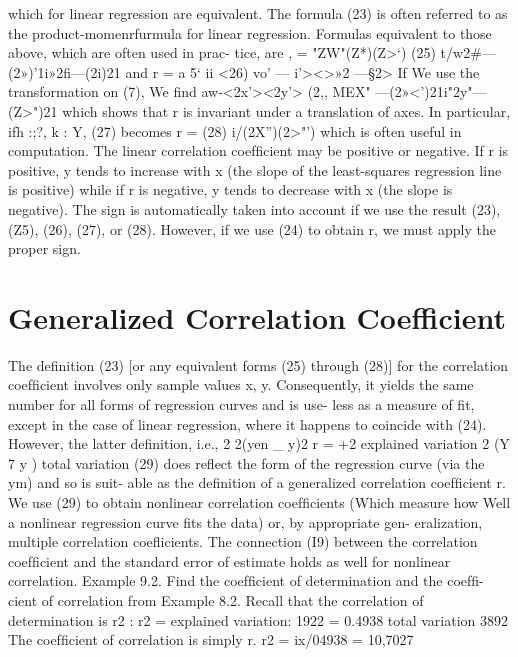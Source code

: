{%
which for linear regression are equivalent. The formula (23) is often
referred to as the product-momenrfurmula for linear regression.
Formulas equivalent to those above, which are often used in prac-
tice, are
, = "ZW"(Z*)(Z>‘) (25)
t/w2#—(2»)’1i»2ﬁ—(2i)21
and
r = a 5‘ ii <26)
vo’ — i’><>»2 —§2>
If We use the transformation on (7), We ﬁnd
 aw-<2x'><2y'> (2,,
\/MEX" —(2»<')21i"2y"—(Z>")21
which shows that r is invariant under a translation of axes. In particular,
ifh :;?, k : Y, (27) becomes
r =  (28)
i/(2X”)(2>"’)
which is often useful in computation.
The linear correlation coefﬁcient may be positive or negative. If r
is positive, y tends to increase with x (the slope of the least-squares
regression line is positive) while if r is negative, y tends to decrease
with x (the slope is negative). The sign is automatically taken into
account if we use the result (23), (Z5), (26), (27), or (28). However, if
we use (24) to obtain r, we must apply the proper sign.

\section{Generalized Correlation Coefficient}
The deﬁnition (23) [or any equivalent forms (25) through (28)] for the
correlation coefﬁcient involves only sample values x, y. Consequently,
it yields the same number for all forms of regression curves and is use-
less as a measure of ﬁt, except in the case of linear regression, where it
happens to coincide with (24). However, the latter deﬁnition, i.e.,
2 2(yen _ y)2
r = +2 explained variation
2 (Y 7 y ) total variation (29)
does reﬂect the form of the regression curve (via the ym) and so is suit-
able as the deﬁnition of a generalized correlation coefﬁcient r. We use
(29) to obtain nonlinear correlation coefﬁcients (Which measure how
Well a nonlinear regression curve ﬁts the data) or, by appropriate gen-
eralization, multiple correlation coeﬂicients. The connection (I9)
between the correlation coefﬁcient and the standard error of estimate
holds as well for nonlinear correlation.
Example 9.2. Find the coefﬁcient of determination and the coefﬁ-
cient of correlation from Example 8.2.
Recall that the correlation of determination is r2 :
r2 = explained variation: 1922 = 0.4938
total variation 3892
The coefﬁcient of correlation is simply r.
r2 = ix/04938 = 10,7027

}
